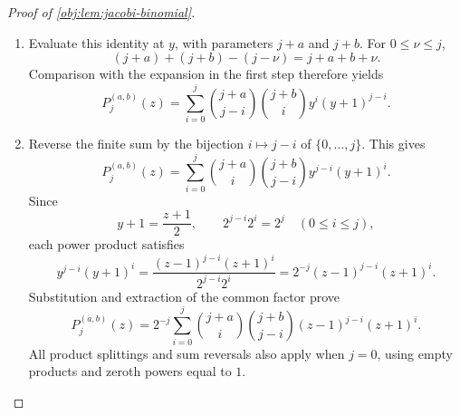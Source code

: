 \documentclass[11pt]{article}
\begin{document}
\begin{proof}[Proof of \cref{obj:lem:jacobi-binomial}]
\begin{enumerate}
The generalized Vandermonde convolution for falling-factorial coefficients states
\[
\binom{\gamma+\gamma_{\mathrm{aux}}}{\nu}
=
\sum_{i=0}^{\nu}\binom{\gamma}{i}\binom{\gamma_{\mathrm{aux}}}{\nu-i},
\qquad \nu\in\mathbb N_0.
\]

For \(0\le\nu\le j\), the terms with \(i>\nu\) contribute zero to the coefficient of \(\xi^\nu\) on the left. Expanding \((\xi+1)^{j-i}\), then applying the product identity and Vandermonde convolution, gives that coefficient as
\[
\begin{aligned}
\sum_{i=0}^{\nu}
\binom{\gamma}{j-i}\binom{\gamma_{\mathrm{aux}}}{i}\binom{j-i}{\nu-i}
&=
\binom{\gamma}{j-\nu}
\sum_{i=0}^{\nu}
\binom{\gamma_{\mathrm{aux}}}{i}\binom{\gamma-(j-\nu)}{\nu-i}\\
&=
\binom{\gamma}{j-\nu}
\binom{\gamma+\gamma_{\mathrm{aux}}-(j-\nu)}{\nu}.
\end{aligned}
\]
For \(\nu>j\), every \(0\le i\le j\) satisfies
\[
\nu-i>j-i,
\qquad
\binom{j-i}{\nu-i}=0.
\]
Hence the coefficient is zero on both sides. Equality of all coefficients proves the polynomial identity.

\item Evaluate this identity at \(y\), with parameters \(j+a\) and \(j+b\). For \(0\le\nu\le j\),
\[
(j+a)+(j+b)-(j-\nu)=j+a+b+\nu.
\]
Comparison with the expansion in the first step therefore yields
\[
P_j^{(a,b)}(z)
=
\sum_{i=0}^{j}
\binom{j+a}{j-i}\binom{j+b}{i}
y^i(y+1)^{j-i}.
\]

\item Reverse the finite sum by the bijection \(i\mapsto j-i\) of \(\{0,\ldots,j\}\). This gives
\[
P_j^{(a,b)}(z)
=
\sum_{i=0}^{j}
\binom{j+a}{i}\binom{j+b}{j-i}
y^{j-i}(y+1)^i.
\]
Since
\[
y+1=\frac{z+1}{2},
\qquad
2^{j-i}2^i=2^j
\quad(0\le i\le j),
\]
each power product satisfies
\[
y^{j-i}(y+1)^i
=
\frac{(z-1)^{j-i}(z+1)^i}{2^{j-i}2^i}
=
2^{-j}(z-1)^{j-i}(z+1)^i.
\]
Substitution and extraction of the common factor prove
\[
P_j^{(a,b)}(z)
=
2^{-j}\sum_{i=0}^{j}
\binom{j+a}{i}\binom{j+b}{j-i}
(z-1)^{j-i}(z+1)^i.
\]
All product splittings and sum reversals also apply when \(j=0\), using empty products and zeroth powers equal to \(1\).
\end{enumerate}
\end{proof}
\end{document}
